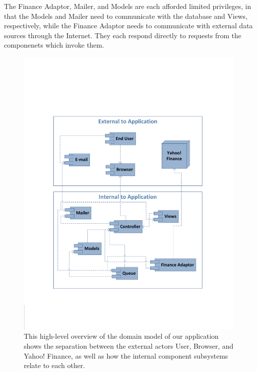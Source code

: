 The Finance Adaptor, Mailer, and Models are each afforded limited privileges, in that the
Models and Mailer need to communicate with the database and Views, respectively, 
while the Finance Adaptor needs to communicate with external data sources through the Internet.
They each respond directly to requests from the componenets which invoke them.

\begin{figure}
\centering
\label{domainModel2}
\includegraphics[width=6.5in]{./img/domainModel2.pdf}
\caption{This high-level overview of the domain model of our application shows the 
separation between the external actors User, Browser, and Yahoo! Finance, as well as
how the internal component subsystems relate to each other.}
\end{figure}
%
%
